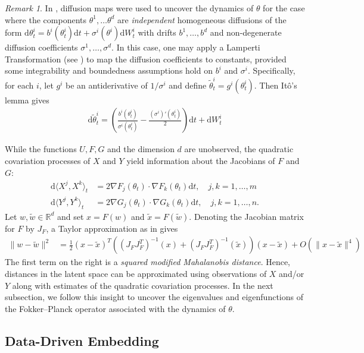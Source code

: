 \documentclass[11pt]{article}
\theoremstyle{plain}
\theoremstyle{definition}
\theoremstyle{remark}
\newtheorem{remark}[theorem]{Remark}
\numberwithin{equation}{section}
\newcommand{\R}{\mathbb{R}}
\renewcommand{\d}{\mathrm{d}}
\newcommand{\lb}{\left}
\newcommand{\rb}{\right}
\newcommand{\wt}{\widetilde}
\begin{document}
\begin{remark}\label{rmk:homogenous}
In \citet{singer2008nonlinear}, diffusion maps were used to uncover the dynamics of $\theta$ for the case where the components $\theta^1,\dots \theta^d$ are \emph{independent} homogeneous diffusions of the form $\d \theta_t^i = b^i(\theta_t^i)\d t+\sigma^i(\theta^i)\d W_t^i$ with drifts $b^1,\dots, b^d$ and non-degenerate diffusion coefficients $\sigma^1,\dots,\sigma^d$. In this case, one may apply a Lamperti Transformation (see \citet[Chapter 5, Exercise 2.20]{karatzas_brownian_2014}) to map the diffusion coefficients to constants, provided some integrability and boundedness assumptions hold on $b^i$ and $\sigma^i$. Specifically, for each $i$, let $g^i$ be an antiderivative of $1/\sigma^i$ and define $\wt\theta^i_t=g^i(\theta_t^i)$. Then It\^{o}'s lemma gives
\begin{align*}
\d\wt\theta^i_t=\lb(\frac{b^i(\theta_t^i)}{\sigma^i(\theta_t^i)}-\frac{(\sigma^i)'(\theta_t^i)}{2}\rb)\d t+\d W_t^i
\end{align*}
\end{remark}

While the functions $U,F,G$ and the dimension $d$ are unobserved, the quadratic covariation processes of $X$ and $Y$ yield information about the Jacobians of $F$ and $G$:
\begin{align*}
\d \langle X^j,X^k\rangle_t&=2\nabla F_j(\theta_t) \cdot \nabla F_k(\theta_t)\d t,\quad j,k=1,\dots, m\\
\d \langle Y^j,Y^k\rangle_t&=2\nabla G_j(\theta_t) \cdot \nabla G_k(\theta_t)\d t,\quad j,k=1,\dots, n.
\end{align*}
Let $w,\wt w\in \R^d$ and set $x=F(w)$ and $\wt x=F(\wt w)$. Denoting the Jacobian matrix for $F$ by $J_F$, a Taylor approximation as in \citet{singer2008nonlinear} gives
\begin{align}\label{eq:mahalanobis}
\|w-\wt w\|^2&=\frac{1}{2}(x-\wt x)^T\lb((J_FJ_F^T)^{-1}(x)+(J_FJ_F^T)^{-1}(\wt x)\rb)(x-\wt x)+O(\|x-\wt x\|^4)
\end{align}
The first term on the right is a \emph{squared modified Mahalanobis distance}. Hence, distances in the latent space can be approximated using observations of $X$ and/or $Y$ along with estimates of the quadratic covariation processes.
In the next subsection, we follow this insight to uncover the eigenvalues and eigenfunctions of the Fokker--Planck operator associated with the dynamics of $\theta$.

\subsection{Data-Driven Embedding}\label{sec:embedding}
\end{document}
